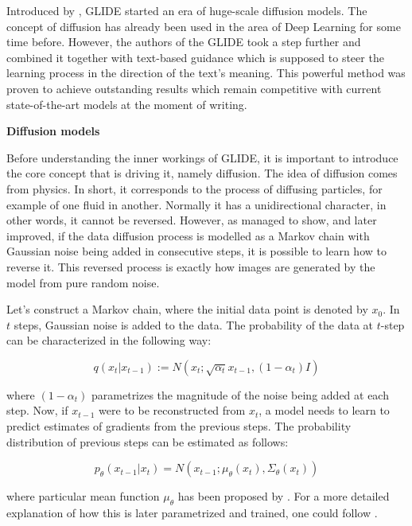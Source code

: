 \documentclass[
]{krantz}
\renewenvironment{quote}{\begin{VF}}{\end{VF}}
\begin{document}
Introduced by \citet{Glide2021}, GLIDE started an era of huge-scale diffusion models. The concept of diffusion has already been used in the area of Deep Learning for some time before. However, the authors of the GLIDE took a step further and combined it together with text-based guidance which is supposed to steer the learning process in the direction of the text's meaning. This powerful method was proven to achieve outstanding results which remain competitive with current state-of-the-art models at the moment of writing.

\textbf{Diffusion models}

Before understanding the inner workings of GLIDE, it is important to introduce the core concept that is driving it, namely diffusion. The idea of diffusion comes from physics. In short, it corresponds to the process of diffusing particles, for example of one fluid in another. Normally it has a unidirectional character, in other words, it cannot be reversed. However, as \citet{Diffusion2015} managed to show, and \citet{DenoisingDiffusion2020} later improved, if the data diffusion process is modelled as a Markov chain with Gaussian noise being added in consecutive steps, it is possible to learn how to reverse it. This reversed process is exactly how images are generated by the model from pure random noise.

Let's construct a Markov chain, where the initial data point is denoted by \(x_{0}\). In \(t\) steps, Gaussian noise is added to the data. The probability of the data at \(t\)-step can be characterized in the following way:

\begin{quote}
\[q(x_{t}|x_{t-1}):=N(x_{t};\sqrt{\alpha_{t}}x_{t-1},(1-\alpha_{t})I)\]
\end{quote}

where \((1-\alpha_{t})\) parametrizes the magnitude of the noise being added at each step. Now, if \(x_{t-1}\) were to be reconstructed from \(x_{t}\), a model needs to learn to predict estimates of gradients from the previous steps. The probability distribution of previous steps can be estimated as follows:

\begin{quote}
\[p_{\theta}(x_{t-1}|x_{t})=N(x_{t-1};\mu_{\theta}(x_{t}),\Sigma_{\theta}(x_{t}))\]
\end{quote}

where particular mean function \(\mu_{\theta}\) has been proposed by \citet{DenoisingDiffusion2020}. For a more detailed explanation of how this is later parametrized and trained, one could follow \citet{weng2021diffusion}.
\end{document}
